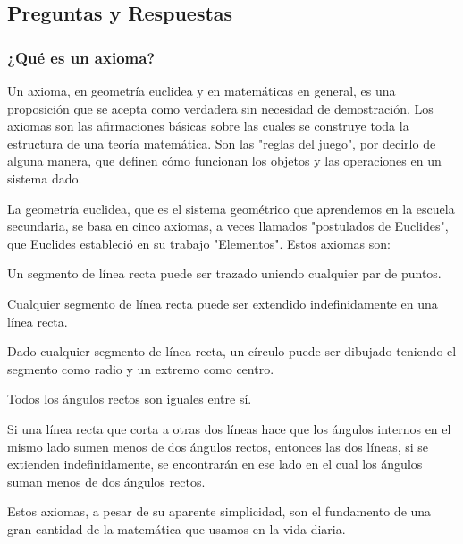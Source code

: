 \subsection{Preguntas y Respuestas}

\subsubsection{¿Qué es un axioma?}

Un axioma, en geometría euclidea y en matemáticas en general, es una proposición que se acepta como verdadera sin necesidad de demostración. Los axiomas son las afirmaciones básicas sobre las cuales se construye toda la estructura de una teoría matemática. Son las "reglas del juego", por decirlo de alguna manera, que definen cómo funcionan los objetos y las operaciones en un sistema dado.

La geometría euclidea, que es el sistema geométrico que aprendemos en la escuela secundaria, se basa en cinco axiomas, a veces llamados "postulados de Euclides", que Euclides estableció en su trabajo "Elementos". Estos axiomas son:

\begin{axiom}
Un segmento de línea recta puede ser trazado uniendo cualquier par de puntos.
\end{axiom}

\begin{axiom}
Cualquier segmento de línea recta puede ser extendido indefinidamente en una línea recta.
\end{axiom}

\begin{axiom}
Dado cualquier segmento de línea recta, un círculo puede ser dibujado teniendo el segmento como radio y un extremo como centro.
\end{axiom}

\begin{axiom}
Todos los ángulos rectos son iguales entre sí.
\end{axiom}

\begin{axiom}
Si una línea recta que corta a otras dos líneas hace que los ángulos internos en el mismo lado sumen menos de dos ángulos rectos, entonces las dos líneas, si se extienden indefinidamente, se encontrarán en ese lado en el cual los ángulos suman menos de dos ángulos rectos.
\end{axiom}

Estos axiomas, a pesar de su aparente simplicidad, son el fundamento de una gran cantidad de la matemática que usamos en la vida diaria.

